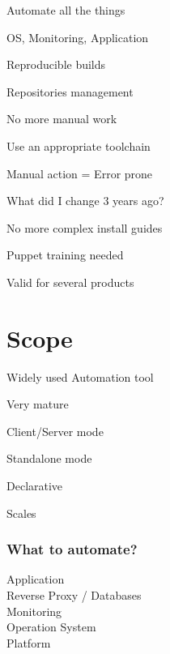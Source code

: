 \begin{iframe}[Automation]
\item Automate all the things
\item OS, Monitoring, Application
\item Reproducible builds
\item Repositories management
\end{iframe}

\begin{iframe}
\item No more manual work
\item Use an appropriate toolchain
\item Manual action = Error prone
\item What did I change 3 years ago?
\end{iframe}
\begin{iframe}
\item No more complex install guides
\item Puppet training needed
\item Valid for several products
\end{iframe}

\section{Scope}

\begin{iframe}[Puppet]
\item Widely used Automation tool\pause
\item Very mature\pause
\item Client/Server mode\pause
\item Standalone mode\pause
\item Declarative\pause
\item Scales
\end{iframe}

\begin{frame}
    \frametitle{What to automate?}
    \huge
    Application\\
    Reverse Proxy / Databases\\
    Monitoring\\
    Operation System\\
    Platform
\end{frame}

